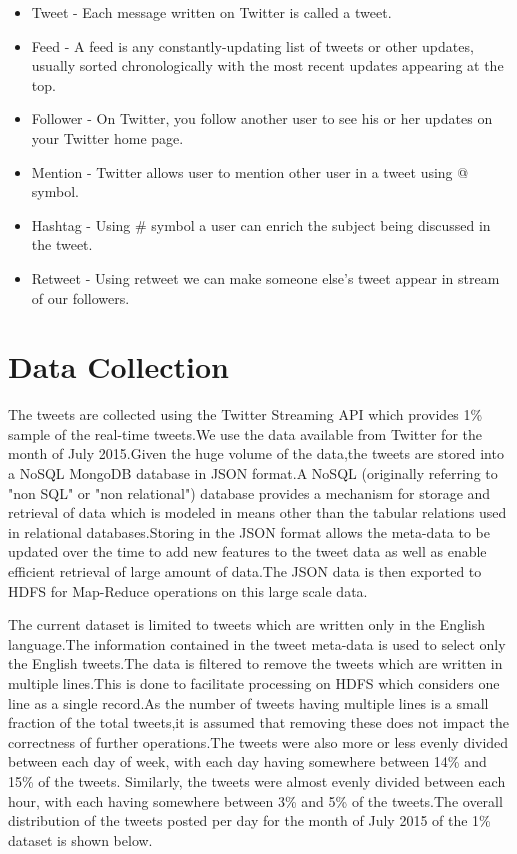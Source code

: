 		\begin{itemize}
			\item Tweet - Each message written on Twitter is called a tweet.
			\item Feed - A feed is any constantly-updating list of tweets or other updates, usually sorted chronologically with the most recent updates appearing at the top.
			\item Follower - On Twitter, you follow another user to see his or her updates on your Twitter home page.
			\item Mention - Twitter allows user to mention other user in a tweet using @ symbol.
			\item Hashtag - Using \# symbol a user can enrich the subject being discussed in the tweet.  
			\item Retweet - Using retweet we can make someone else's tweet appear in stream of our followers.
		\end{itemize}	
					
		\section{Data Collection}
		\par
		The tweets are collected using the Twitter Streaming API which provides 1\% sample of the real-time tweets.We use the data available from Twitter for the month of July 2015.Given the huge volume of the data,the tweets are stored into a NoSQL MongoDB database in JSON format.A NoSQL (originally referring to "non SQL" or "non relational") database provides a mechanism for storage and retrieval of data which is modeled in means other than the tabular relations used in relational databases.Storing in the JSON format allows the meta-data to be updated over the time to add new features to the tweet data as well as enable efficient retrieval of large amount of data.The JSON data is then exported to HDFS for Map-Reduce operations on this large scale data.
		\\
		\par
		The current dataset is limited to tweets which are written only in the English language.The information contained in the tweet meta-data is used to select only the English tweets.The data is filtered to remove the tweets which are written in multiple lines.This is done to facilitate processing on HDFS which considers one line as a single record.As the number of tweets having multiple lines is a small fraction of the total tweets,it is assumed that removing these does not impact the correctness of further operations.The tweets were also more or less evenly divided between each day of week, with each day having somewhere between 14\% and 15\% of the tweets. Similarly, the tweets were almost evenly divided between each hour, with each having somewhere between 3\% and 5\% of the tweets.The overall distribution of the tweets posted per day for the month of July 2015 of the 1\% dataset is shown below. 
		
